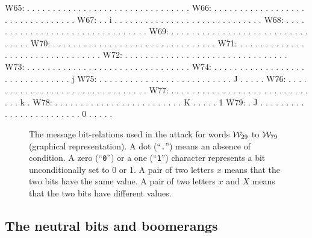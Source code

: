 \begin{verbbox}
W65:	 . . . . . . . . . . . . . . . . . . . . . . . . . . . . . . . .
W66:	 . . . . . . . . . . . . . . . . . . . . . . . . . . . . . . . .
W67:	 . . i . . . . . . . . . . . . . . . . . . . . . . . . . . . . .
W68:	 . . . . . . . . . . . . . . . . . . . . . . . . . . . . . . . .
W69:	 . . . . . . . . . . . . . . . . . . . . . . . . . . . . . . . .
W70:	 . . . . . . . . . . . . . . . . . . . . . . . . . . . . . . . .
W71:	 . . . . . . . . . . . . . . . . . . . . . . . . . . . . . . . .
W72:	 . . . . . . . . . . . . . . . . . . . . . . . . . . . . . . . .
W73:	 . . . . . . . . . . . . . . . . . . . . . . . . . . . . . . . .
W74:	 . . . . . . . . . . . . . . . . . . . . . . . . . . . . . . . j
W75:	 . . . . . . . . . . . . . . . . . . . . . . . . . . J . . . . .
W76:	 . . . . . . . . . . . . . . . . . . . . . . . . . . . . . . . .
W77:	 . . . . . . . . . . . . . . . . . . . . . . . . . . . . . . k .
W78:	 . . . . . . . . . . . . . . . . . . . . . . . . . K . . . . . 1
W79:	 . J . . . . . . . . . . . . . . . . . . . . . . . . 0 . . . . .
\end{verbbox}
\endgroup

\begin{figure}[!htb]
\centering
  \theverbbox
  \caption[The message bit-relations used in the attack for words $\expmess_{29}$ to $\expmess_{79}$ (graphical representation).]{The message bit-relations used in the attack for words $\expmess_{29}$ to $\expmess_{79}$ (graphical representation).
  A dot (``\texttt{.}'') means an absence of condition. A zero (``\texttt{0}'') or a one (``\texttt{1}'') character represents a bit unconditionally set to 0 or 1.
  A pair of two letters $x$ means that the two bits have the same value. A pair of two
  letters $x$ and $X$ means that the two bits have different values.
  \label{fig:msgbitrel80_graph}}
\end{figure}

\subsection{The neutral bits and boomerangs}
\label{sec:neutral_bits80}

